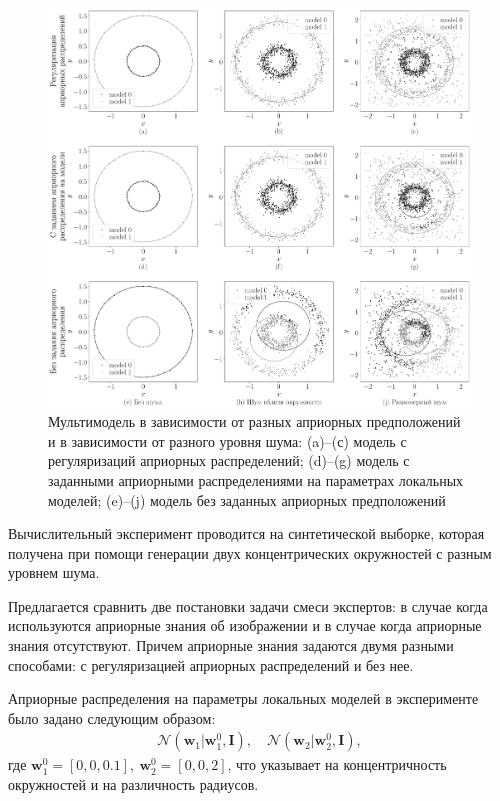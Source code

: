 \documentclass[12pt, twoside]{article}
\numberwithin{equation}{section}
\begin{document}
\begin{figure}[h!t]\center
\includegraphics[width=1\textwidth]{result/experiment_synthetic}
\caption{Мультимодель в зависимости от разных априорных предположений и в зависимости от разного уровня шума: (a)--(с) модель с регуляризаций априорных распределений; (d)--(g) модель с заданными априорными распределениями на параметрах локальных моделей; (e)--(j) модель без заданных априорных предположений}
\label{experiment:1}
\end{figure}
Вычислительный эксперимент проводится на синтетической выборке, которая получена при помощи генерации двух концентрических окружностей с разным уровнем шума.

Предлагается сравнить две постановки задачи смеси экспертов: в случае когда используются априорные знания об изображении и в случае когда априорные знания отсутствуют. Причем априорные знания задаются двумя разными способами: с регуляризацией априорных распределений и без нее.

Априорные распределения на параметры локальных моделей в эксперименте было задано следующим образом:
\begin{equation}
\label{eq:ce:1}
\begin{aligned}
\mathcal{N}\left(\textbf{w}_1|\textbf{w}^{0}_{1}, \textbf{I}\right), \quad \mathcal{N}\left(\textbf{w}_2|\textbf{w}^{0}_{2}, \textbf{I}\right),
\end{aligned}
\end{equation}
где $\textbf{w}^{0}_1 = [0, 0, 0.1],\ \textbf{w}^{0}_2 = [0, 0, 2]$, что указывает на концентричность окружностей и на различность радиусов.
\end{document}

